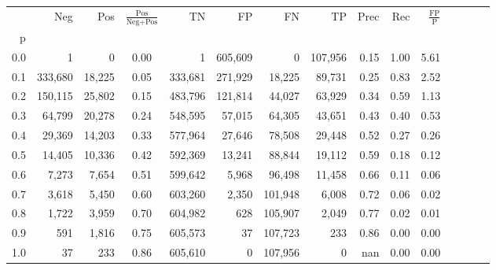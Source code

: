 \begin{tabular}{rrrcrrrrrrrrrrr}
\toprule
{} &      Neg &     Pos & $\frac{\text{Pos}}{\text{Neg}+\text{Pos}}$ &       TN &       FP &       FN &       TP &  Prec &   Rec & $\frac{\text{FP}}{\text{P}}$ \\
p   &          &         &                                            &          &          &          &          &       &       &                              \\
\midrule
0.0 &        1 &       0 &                                       0.00 &        1 &  605,609 &        0 &  107,956 &  0.15 &  1.00 &                         5.61 \\
0.1 &  333,680 &  18,225 &                                       0.05 &  333,681 &  271,929 &   18,225 &   89,731 &  0.25 &  0.83 &                         2.52 \\
0.2 &  150,115 &  25,802 &                                       0.15 &  483,796 &  121,814 &   44,027 &   63,929 &  0.34 &  0.59 &                         1.13 \\
0.3 &   64,799 &  20,278 &                                       0.24 &  548,595 &   57,015 &   64,305 &   43,651 &  0.43 &  0.40 &                         0.53 \\
0.4 &   29,369 &  14,203 &                                       0.33 &  577,964 &   27,646 &   78,508 &   29,448 &  0.52 &  0.27 &                         0.26 \\
0.5 &   14,405 &  10,336 &                                       0.42 &  592,369 &   13,241 &   88,844 &   19,112 &  0.59 &  0.18 &                         0.12 \\
0.6 &    7,273 &   7,654 &                                       0.51 &  599,642 &    5,968 &   96,498 &   11,458 &  0.66 &  0.11 &                         0.06 \\
0.7 &    3,618 &   5,450 &                                       0.60 &  603,260 &    2,350 &  101,948 &    6,008 &  0.72 &  0.06 &                         0.02 \\
0.8 &    1,722 &   3,959 &                                       0.70 &  604,982 &      628 &  105,907 &    2,049 &  0.77 &  0.02 &                         0.01 \\
0.9 &      591 &   1,816 &                                       0.75 &  605,573 &       37 &  107,723 &      233 &  0.86 &  0.00 &                         0.00 \\
1.0 &       37 &     233 &                                       0.86 &  605,610 &        0 &  107,956 &        0 &   nan &  0.00 &                         0.00 \\
\bottomrule
\end{tabular}
